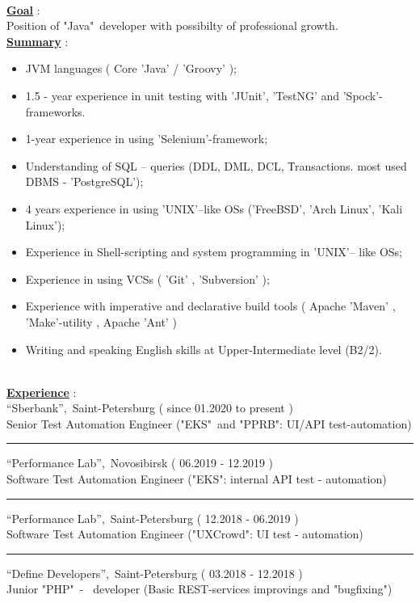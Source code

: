 \documentclass[hidelinks,12pt,a4paper,oneside]{article}
\begin{document}
\ 
\\[2px]
{\Large \underline{\textbf{Goal}}} :\\[4px]
{\large Position of "Java"\ developer with possibilty of professional growth.} \\[3px]
{\Large \underline{\textbf{Summary}}} : 
{\large
\begin{itemize}[noitemsep]
	\item JVM languages ( Core 'Java' /  'Groovy' );
	\item 1.5 - year experience in unit testing with 'JUnit', 'TestNG' and 'Spock'- frameworks.
	\item 1-year experience in using 'Selenium'-framework;
	\item Understanding of SQL – queries (DDL, DML, DCL, Тransactions. most used DBMS -  'PostgreSQL');
	\item 4 years experience in using 'UNIX'--like OSs ('FreeBSD', 'Arch Linux', 'Kali Linux');
	\item Experience in Shell-scripting and system programming in 'UNIX'-- like OSs;
	\item Experience in using VCSs ( 'Git' , 'Subversion' );
	\item Experience with imperative and declarative build tools ( Apache 'Maven' , 'Make'-utility , Apache 'Ant' )
	\item Writing and speaking English skills at Upper-Intermediate level (B2/2).
\end{itemize}
 }
\ \\
{\Large \underline{\textbf{Experience}}} : \\ [6px]
{\large
“Sberbank”,\ Saint-Petersburg {\small( since 01.2020 to present )} \\
Senior Test Automation Engineer ("EKS"\ and "PPRB": UI/API test-automation)
}\par\noindent\rule{\textwidth}{0.4pt}
{\large
“Performance Lab”,\ Novosibirsk {\small( 06.2019 - 12.2019 )} \\
Software Test Automation Engineer ("EKS": internal API test - automation)
}\par\noindent\rule{\textwidth}{0.4pt}
{\large
“Performance Lab”,\ Saint-Petersburg {\small( 12.2018 - 06.2019 )} \\
Software Test Automation Engineer ("UXCrowd": UI test - automation) 
}\par\noindent\rule{\textwidth}{0.4pt}
{\large
“Define Developers”,\ Saint-Petersburg {\small( 03.2018 - 12.2018 )} \\
Junior "PHP"\ - \ developer (Basic REST-services improvings and "bugfixing") \\
}
\end{document}
